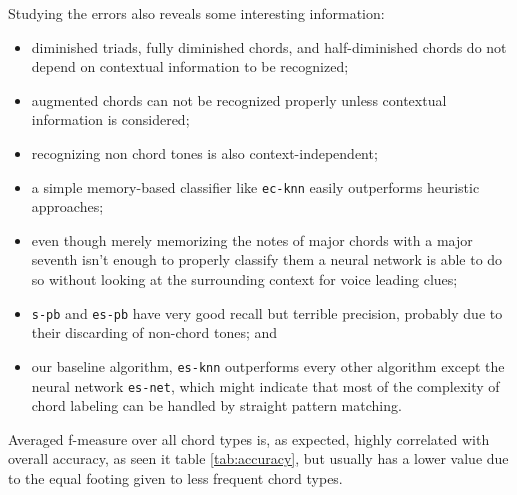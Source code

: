 \documentclass{article}
\begin{document}
Studying the errors also reveals some interesting information:
\begin{itemize}
\item diminished triads, fully diminished chords, and half-diminished
  chords do not depend on contextual information to be recognized;
\item augmented chords can not be recognized properly unless
  contextual information is considered;
\item recognizing non chord tones is also context-independent;
\item a simple memory-based classifier like \texttt{ec-knn}
  easily outperforms heuristic approaches;
\item even though merely memorizing the notes of major chords with a major seventh
  isn't enough to properly classify them a neural network is able to
  do so without looking at the surrounding context for voice leading
  clues;
\item \texttt{s-pb} and \texttt{es-pb} have very good recall but
  terrible precision, probably due to their discarding of non-chord
  tones; and
\item our baseline algorithm, \texttt{es-knn} outperforms every other
  algorithm except the neural network \texttt{es-net}, which might
  indicate that most of the complexity of chord labeling can be
  handled by straight pattern matching.
\end{itemize}

Averaged f-measure over all chord types is, as expected, highly
correlated with overall accuracy, as seen it table \ref{tab:accuracy},
but usually has a lower value due to the equal footing given to less
frequent chord types.
\end{document}
